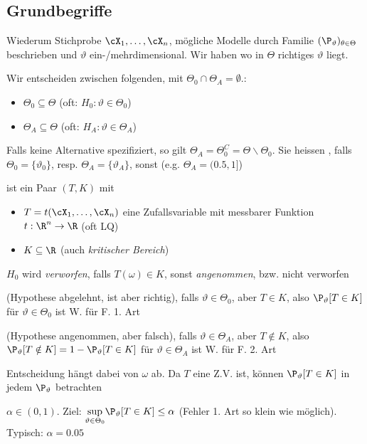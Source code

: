 \subsection{Grundbegriffe}
Wiederum Stichprobe $\cX_1, \ldots, \cX_n$, mögliche Modelle durch Familie $(\P_\vartheta)_{\theta \in \Theta}$ beschrieben und $\vartheta$ ein-/mehrdimensional.
Wir haben  wo in $\Theta$ richtiges $\vartheta$ liegt.

Wir entscheiden zwischen folgenden, mit $\Theta_0 \cap \Theta_A = \emptyset$.:
\begin{itemize}
    \item {} $\Theta_0 \subseteq \Theta$ (oft: $H_0: \vartheta \in \Theta_0$)
    \item {} $\Theta_A \subseteq \Theta$ (oft: $H_A: \vartheta \in \Theta_A$)
\end{itemize}
Falls keine Alternative spezifiziert, so gilt $\Theta_A = \Theta_0^C = \Theta \backslash \Theta_0$.
Sie heissen , falls $\Theta_0 = \{ \vartheta_0 \}$, resp. $\Theta_A = \{ \vartheta_A \}$, sonst  (e.g. $\Theta_A = (0.5, 1]$)

\shortdefinition[Test] ist ein Paar $(T, K)$ mit
\begin{itemize}
    \item {} $T = t(\cX_1, \ldots, \cX_n)$ eine Zufallsvariable mit messbarer Funktion $t: \R^n \rightarrow \R$ (oft LQ)
    \item {} $K \subseteq \R$ (auch \textit{kritischer Bereich})
\end{itemize}
 $H_0$ wird \textit{verworfen}, falls $T(\omega) \in K$, sonst \textit{angenommen}, bzw. nicht verworfen

 (Hypothese abgelehnt, ist aber richtig), falls $\vartheta \in \Theta_0$, aber $T \in K$, also
$\P_\vartheta[T \in K]$ für $\vartheta \in \Theta_0$ ist W. für F. 1. Art

 (Hypothese angenommen, aber falsch), falls $\vartheta \in \Theta_A$, aber $T \notin K$, also
$\P_\vartheta[T \notin K] = 1 - \P_\vartheta[T \in K]$ für $\vartheta \in \Theta_A$ ist W. für F. 2. Art

\shortremark Entscheidung hängt dabei von  $\omega$ ab.
Da $T$ eine Z.V. ist, können $\P_\vartheta[T \in K]$ in jedem $\P_\vartheta$ betrachten

\shortdefinition[Signifikanzniveau] $\alpha \in (0, 1)$. Ziel: $\underset{\vartheta \in \Theta_0}{\sup} \P_\vartheta[T \in K] \leq \alpha$
(Fehler 1. Art so klein wie möglich). Typisch: $\alpha = 0.05$

